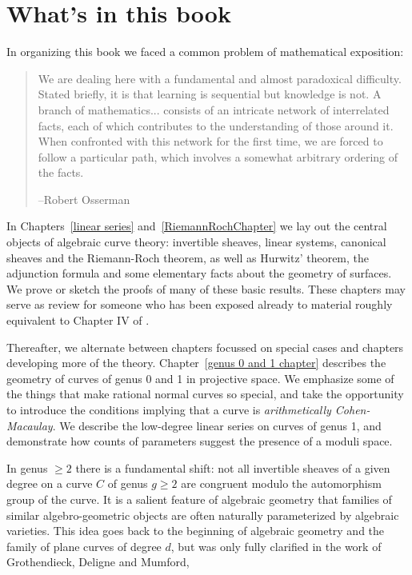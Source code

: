 

\section{What's in this book}
In organizing this book we faced a common problem of  mathematical exposition:
\begin{quote}
\small\sf
We are dealing here with a fundamental and almost paradoxical difficulty. Stated briefly, it is that learning is sequential but knowledge is not. A branch of mathematics... consists of an intricate network of interrelated facts, each of which contributes to the understanding of those around it. When confronted with this network for the first time, we are forced to follow a particular path, which involves a somewhat arbitrary ordering of the facts.

--Robert Osserman\cite{Poetry}

\end{quote}

In Chapters~\ref{linear series} and~\ref{RiemannRochChapter} we lay out the central objects of algebraic curve theory: invertible sheaves, linear systems, canonical sheaves and the Riemann-Roch theorem, as well as
Hurwitz' theorem,
the adjunction formula and  some elementary facts about the geometry of surfaces. We prove or sketch the
proofs of many of these basic results. These chapters may serve as review for someone who has been exposed already to material roughly equivalent to Chapter IV of \cite{Hartshorne1977}. 

Thereafter, we alternate between chapters focussed on special cases and chapters developing more of the theory. Chapter~\ref{genus 0 and 1 chapter}  describes the geometry of curves of genus 0 and 1 in projective space. We emphasize some of the things that make rational normal curves so special, and take the opportunity to introduce the conditions implying that a curve is \emph{arithmetically Cohen-Macaulay}. We describe the low-degree linear series on curves of genus 1, and demonstrate how counts of parameters suggest the presence of a moduli space. 

In genus $\geq 2$ there is a fundamental shift: not all invertible sheaves of a given degree on a curve $C$ of genus $g \geq 2$ are congruent modulo the automorphism group of the curve.
It is a salient feature of algebraic geometry that families of similar algebro-geometric objects are often naturally parameterized by algebraic varieties. This idea goes back to the beginning of algebraic geometry and the family of plane curves of degree $d$, but was only fully clarified in the work of Grothendieck, Deligne and Mumford,

